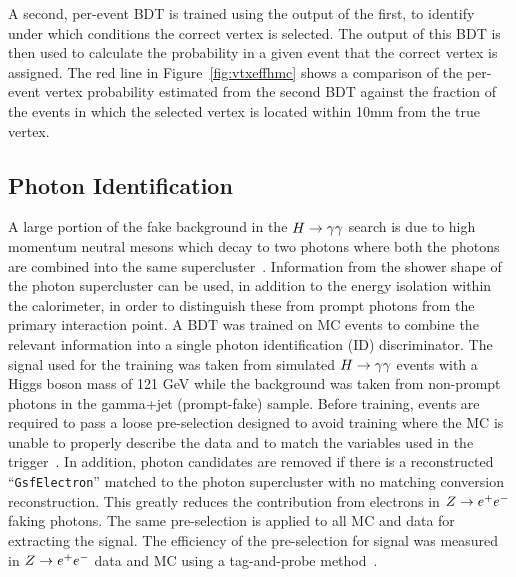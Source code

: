 A second, per-event BDT is trained using the output of the first, to identify 
under which conditions the correct vertex is selected. The output of this BDT is then used to 
calculate the probability in a given event that the correct vertex is assigned. The red line in Figure~\ref{fig:vtxeffhmc}
shows a comparison of the per-event vertex probability estimated from the second BDT against the 
fraction of the events in which the selected vertex is located within 10mm from the true vertex.

\subsection{Photon Identification}
\label{sec:photonidentification}

A large portion of the fake background in the $H\rightarrow\gamma\gamma$ search is due to high momentum neutral mesons
which decay to two photons where both the photons are combined into the same supercluster~\citep{HIG-11-033}. 
Information from the shower shape of the photon supercluster can be used, in addition to the 
energy isolation within the calorimeter, in order to distinguish these from prompt photons
from the primary interaction point. A BDT was trained on MC events to combine the relevant information
into a single photon identification (ID) discriminator. The signal used for the training was taken from 
simulated $H\rightarrow\gamma\gamma$ events with a Higgs boson mass of 121 GeV while the background was 
taken from non-prompt photons in the gamma+jet (prompt-fake) sample.
Before training, events are required to pass a loose pre-selection designed to avoid training 
where the MC is unable to properly describe the data and to match the variables used in the trigger~\citep{AN-12-048}.
In addition, photon candidates are removed if there is a reconstructed ``\texttt{GsfElectron}'' matched to the 
photon supercluster with no matching conversion reconstruction. This greatly reduces the contribution
from electrons in $Z\rightarrow e^{+}e^{-}$ faking photons. The same pre-selection is applied to all MC and data for extracting the signal.
The efficiency of the pre-selection for signal was measured in $Z\rightarrow e^{+}e^{-}$ data and MC using a tag-and-probe 
method~\citep{AN-12-116}. 

